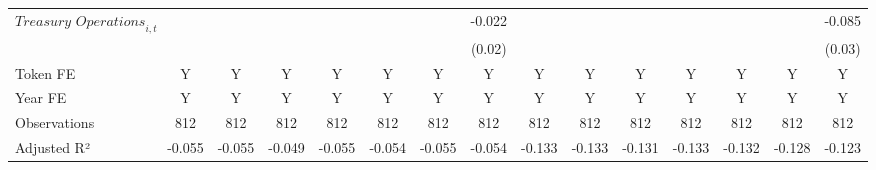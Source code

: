 {\begin{tabular}{l*{14}{c}}
$\textit{Treasury Operations}_{i,t}$&                     &                     &                     &                     &                     &                     &      -0.022         &                     &                     &                     &                     &                     &                     &      -0.085\sym{***}\\
                    &                     &                     &                     &                     &                     &                     &      (0.02)         &                     &                     &                     &                     &                     &                     &      (0.03)         \\
\midrule
Token FE            &           Y         &           Y         &           Y         &           Y         &           Y         &           Y         &           Y         &           Y         &           Y         &           Y         &           Y         &           Y         &           Y         &           Y         \\
Year FE             &           Y         &           Y         &           Y         &           Y         &           Y         &           Y         &           Y         &           Y         &           Y         &           Y         &           Y         &           Y         &           Y         &           Y         \\
Observations        &         812         &         812         &         812         &         812         &         812         &         812         &         812         &         812         &         812         &         812         &         812         &         812         &         812         &         812         \\
Adjusted R²         &      -0.055         &      -0.055         &      -0.049         &      -0.055         &      -0.054         &      -0.055         &      -0.054         &      -0.133         &      -0.133         &      -0.131         &      -0.133         &      -0.132         &      -0.128         &      -0.123         \\
\bottomrule
\end{tabular}
}
